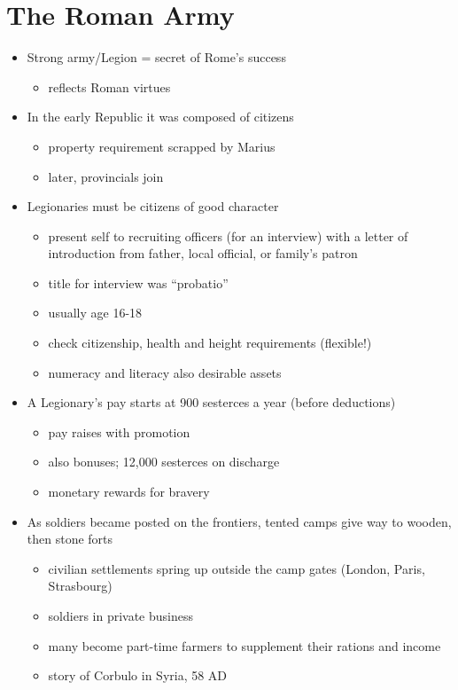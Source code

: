 \documentclass[12pt, twoside]{article}
\begin{document}
\section{The Roman Army}
\begin{itemize}
\item Strong army/Legion = secret of Rome's success
	\begin{itemize}
	\item reflects Roman virtues
	\end{itemize}
\item In the early Republic it was composed of citizens
	\begin{itemize}
	\item property requirement scrapped by Marius
	\item later, provincials join
	\end{itemize}
\item Legionaries must be citizens of good character
	\begin{itemize}
	\item present self to recruiting officers (for an interview) with a letter of introduction from father, local official, or family’s patron
	\item title for interview was “probatio”
	\item usually age 16-18
	\item check citizenship, health and height requirements (flexible!)
	\item numeracy and literacy also desirable assets
	\end{itemize}
\item A Legionary’s pay starts at 900 sesterces a year (before deductions)
	\begin{itemize}
	\item pay raises with promotion
	\item also bonuses; 12,000 sesterces on discharge
	\item monetary rewards for bravery
	\end{itemize}
\item As soldiers became posted on the frontiers, tented camps give way to wooden, then stone forts
	\begin{itemize}
	\item civilian settlements spring up outside the camp gates (London, Paris, Strasbourg)
	\item soldiers in private business
	\item many become part-time farmers to supplement their rations and income
	\item story of Corbulo in Syria, 58 AD
	\end{itemize}
\end{itemize}
	
\end{document}
